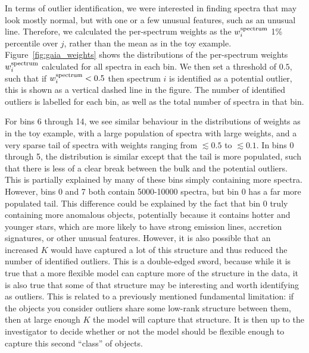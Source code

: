 \documentclass[onecolumn,floatfix]{aastex631}
\begin{document}
In terms of outlier identification, we were interested in finding spectra that may look mostly normal, but with one or a few unusual features, such as an unusual line.
Therefore, we calculated the per-spectrum weights as the $w_i^{\rm spectrum}$ 1\% percentile over $j$, rather than the mean as in the toy example.
Figure~\ref{fig:gaia_weights} shows the distributions of the per-spectrum weights $w_i^{\rm spectrum}$ calculated for all spectra in each bin.
We then set a threshold of $0.5$, such that if $w_i^{\rm spectrum} < 0.5$ then spectrum $i$ is identified as a potential outlier, this is shown as a vertical dashed line in the figure.
The number of identified outliers is labelled for each bin, as well as the total number of spectra in that bin.

For bins 6 through 14, we see similar behaviour in the distributions of weights as in the toy example, with a large population of spectra with large weights, and a very sparse tail of spectra with weights ranging from $\lesssim 0.5$ to $\lesssim 0.1$.
In bins 0 through 5, the distribution is similar except that the tail is more populated, such that there is less of a clear break between the bulk and the potential outliers.
This is partially explained by many of these bins simply containing more spectra.
However, bins 0 and 7 both contain 5000-10000 spectra, but bin 0 has a far more populated tail.
This difference could be explained by the fact that bin 0 truly containing more anomalous objects, potentially because it contains hotter and younger stars, which are more likely to have strong emission lines, accretion signatures, or other unusual features.
However, it is also possible that an increased $K$ would have captured a lot of this structure and thus reduced the number of identified outliers.
This is a double-edged sword, because while it is true that a more flexible model can capture more of the structure in the data, it is also true that some of that structure may be interesting and worth identifying as outliers.
This is related to a previously mentioned fundamental limitation: if the objects you consider outliers share some low-rank structure between them, then at large enough $K$ the model will capture that structure.
It is then up to the investigator to decide whether or not the model should be flexible enough to capture this second ``class'' of objects.
\end{document}
